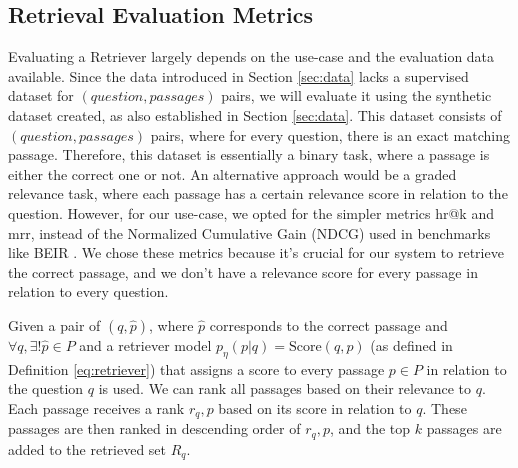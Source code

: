 

\subsection{Retrieval Evaluation Metrics}
\label{subsec:retrieval-eval}

Evaluating a Retriever largely depends on the use-case and the evaluation data available. Since the data introduced in Section \ref{sec:data} lacks a supervised dataset for $(question,\allowbreak passages)$ pairs, we will evaluate it using the synthetic dataset created, as also established in Section \ref{sec:data}. This dataset consists of $(question, passages)$ pairs, where for every question, there is an exact matching passage. Therefore, this dataset is essentially a binary task, where a passage is either the correct one or not. An alternative approach would be a graded relevance task, where each passage has a certain relevance score in relation to the question. However, for our use-case, we opted for the simpler metrics \gls{hr}@k and \gls{mrr}, instead of the Normalized Cumulative Gain (NDCG) used in benchmarks like BEIR \cite{thakur_beir_2021}. We chose these metrics because it's crucial for our system to retrieve the correct passage, and we don't have a relevance score for every passage in relation to every question.

Given a pair of $(q,\hat{p})$, where $\hat{p}$ corresponds to the correct passage and $\forall q, \exists ! \hat{p} \in P$ and a retriever model $p_\eta(p|q) = \text{Score}(q,p)$ (as defined in Definition \ref{eq:retriever}) that assigns a score to every passage $p \in P$ in relation to the question $q$ is used. We can rank all passages based on their relevance to $q$. Each passage receives a rank $r_q,p$ based on its score in relation to $q$. These passages are then ranked in descending order of $r_q,p$, and the top $k$ passages are added to the retrieved set $R_q$.

